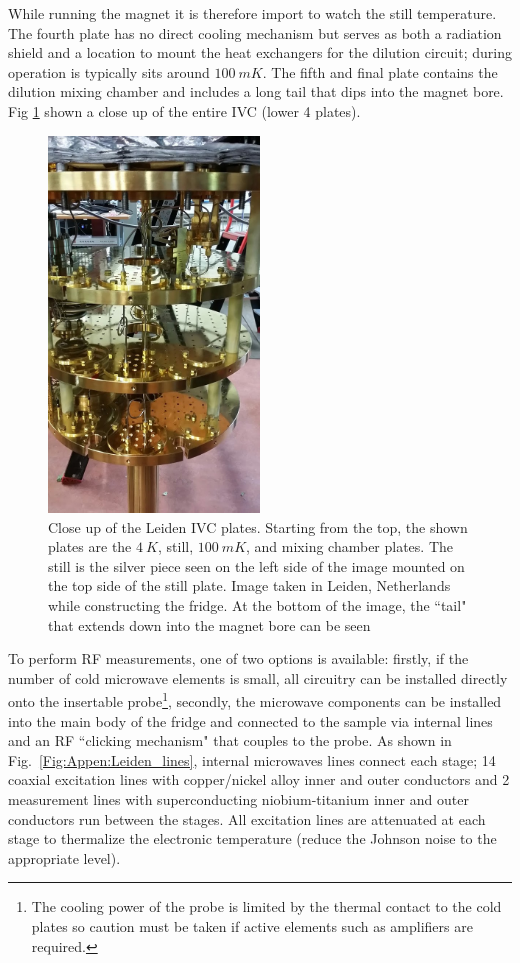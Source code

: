  While running the magnet it is therefore import to watch the still temperature. The fourth plate has no direct cooling mechanism but serves as both a radiation shield and a location to mount the heat exchangers for the dilution circuit; during operation is typically sits around $100~mK$. The fifth and final plate contains the dilution mixing chamber and includes a long tail that dips into the magnet bore. Fig \ref{Fig:Appen:Leiden_Full} shown a close up of the entire IVC (lower 4 plates).

\begin{figure}
\centering
\includegraphics[width = 0.5\textwidth]{figures/appendix/cryostats/Leiden_full.jpg}
\caption{Close up of the Leiden IVC plates. Starting from the top, the shown plates are the $4~K$, still, $100~mK$, and mixing chamber plates. The still is the silver piece seen on the left side of the image mounted on the top side of the still plate. Image taken in Leiden, Netherlands while constructing the fridge. At the bottom of the image, the ``tail" that extends down into the magnet bore can be seen}
\label{Fig:Appen:Leiden_Full}
\end{figure}

To perform RF measurements, one of two options is available: firstly, if the number of cold microwave elements is small, all circuitry can be installed directly onto the insertable probe\footnote{The cooling power of the probe is limited by the thermal contact to the cold plates so caution must be taken if active elements such as amplifiers are required.}, secondly, the microwave components can be installed into the main body of the fridge and connected to the sample via internal lines and an RF ``clicking mechanism" that couples to the probe. As shown in Fig.~\ref{Fig:Appen:Leiden_lines}, internal microwaves lines connect each stage; 14 coaxial excitation lines with copper/nickel alloy inner and outer conductors and 2 measurement lines with superconducting niobium-titanium inner and outer conductors run between the stages. All excitation lines are attenuated at each stage to thermalize the electronic temperature (reduce the Johnson noise to the appropriate level).


